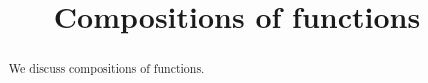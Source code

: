 \documentclass{ximera}
\title{Compositions of functions}
\begin{document}
\begin{abstract}
  We discuss compositions of functions.
\end{abstract}
\maketitle





  

  

\end{document}

